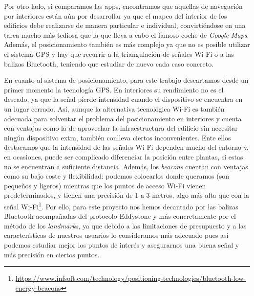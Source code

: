 Por otro lado, si comparamos las apps, encontramos que aquellas de navegación por interiores están aún por desarrollar ya que el mapeo del interior de los edificios debe realizarse de manera particular e individual, convirtiéndose en una tarea mucho más tediosa que la que lleva a cabo el famoso coche de \textit{Google Maps}. Además, el posicionamiento también es más complejo ya que no es posible utilizar el sistema GPS y hay que recurrir a la triangulación de señales Wi-Fi o a las balizas Bluetooth, teniendo que estudiar de nuevo cada caso concreto.

En cuanto al sistema de posicionamiento, para este trabajo descartamos desde un primer momento la tecnología GPS. En interiores su rendimiento no es el deseado, ya que la señal pierde intensidad cuando el dispositivo se encuentra en un lugar cerrado. Así, aunque la alternativa tecnológica Wi-Fi es también adecuada para solventar el problema del posicionamiento en interiores y cuenta con ventajas como la de aprovechar la infraestructura del edificio sin necesitar ningún dispositivo extra, también conlleva ciertos inconvenientes. Ente ellos destacamos que la intensidad de las señales Wi-Fi dependen mucho del entorno y, en ocasiones, puede ser complicado diferenciar la posición entre plantas, si estas no se encuentran a suficiente distancia. Además, los \textit{beacons} cuentan con ventajas como su bajo coste y flexibilidad: podemos colocarlos donde queramos (son pequeños y ligeros) mientras que los puntos de acceso Wi-Fi vienen predeterminados, y tienen una precisión de 1 a 3 metros, algo más alta que con la señal Wi-Fi\footnote{\url{https://www.infsoft.com/technology/positioning-technologies/bluetooth-low-energy-beacons}}. Por ello, para este proyecto nos hemos decantado por las balizas Bluetooth acompañadas del protocolo Eddystone y más concretamente por el método de los \textit{landmarks}, ya que debido a las limitaciones de presupuesto y a las características de nuestros usuarios lo consideramos más adecuado pues así podemos estudiar mejor los puntos de interés y asegurarnos una buena señal y más precisión en ciertos puntos.






 